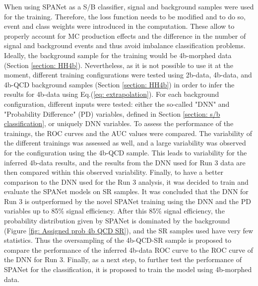 \vspace{0.2 cm}

When using SPANet as a S/B classifier, signal and background samples were used for the training. Therefore, the loss function needs to be modified and to do so, event and class weights were introduced in the computation. These allow to properly account for MC production effects and the difference in the number of signal and background events and thus avoid imbalance classification problems. Ideally, the background sample for the training would be 4b-morphed data (Section \ref{section: HH4b}). Nevertheless, as it is not possible to use it at the moment, different training configurations were tested using 2b-data, 4b-data, and 4b-QCD background samples (Section \ref{section: HH4b}) in order to infer the results for 4b-data using Eq.(\ref{eq: extrapolation}). For each background configuration, different inputs were tested: either the so-called "DNN" and "Probability Difference" (PD) variables, defined in Section \ref{section: s/b classification}, or uniquely DNN variables.  To assess the performance of the trainings, the ROC curves and the AUC values were compared. The variability of the different trainings was assessed as well, and a large variability was observed for the configuration using the 4b-QCD sample. This leads to variability for the inferred 4b-data results, and the results from the DNN used for Run 3 data are then compared within this observed variability. Finally, to have a better comparison to the DNN used for the Run 3 analysis, it was decided to train and evaluate the SPANet models on SR samples. It was concluded that the DNN for Run 3 is outperformed by the novel SPANet training using the DNN and the PD variables up to 85\% signal efficiency. After this 85\% signal efficiency, the probability distribution given by SPANet is dominated by the background (Figure \ref{fig: Assigned prob 4b QCD SR}), and the SR samples used have very few statistics. Thus the oversampling of the 4b-QCD-SR sample is proposed to compare the performance of the inferred 4b-data ROC curve to the ROC curve of the DNN for Run 3. Finally, as a next step, to further test the performance of SPANet for the classification, it is proposed to train the model using 4b-morphed data. 
